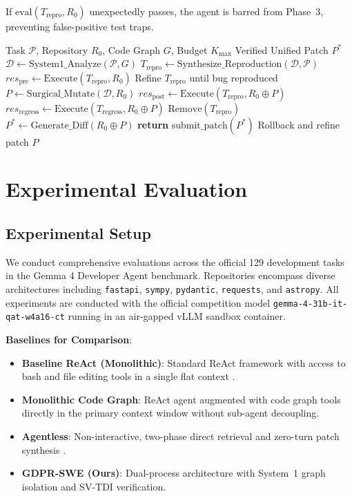 \documentclass[10pt,twocolumn,letterpaper]{article}
\theoremstyle{definition}
\begin{document}
If $\text{eval}(T_{\text{repro}}, R_0)$ unexpectedly passes, the agent is barred from Phase~3, preventing false-positive test traps.

\begin{algorithm}[t]
\caption{GDPR-SWE Execution Cycle}
\label{alg:gdpr}
\begin{algorithmic}[1]
\REQUIRE Task $\mathcal{P}$, Repository $R_0$, Code Graph $G$, Budget $K_{\max}$
\ENSURE Verified Unified Patch $P^*$
\STATE $\mathcal{D} \leftarrow \text{System1\_Analyze}(\mathcal{P}, G)$ 
\STATE $T_{\text{repro}} \leftarrow \text{Synthesize\_Reproduction}(\mathcal{D}, \mathcal{P})$
\STATE $res_{\text{pre}} \leftarrow \text{Execute}(T_{\text{repro}}, R_0)$
    \STATE Refine $T_{\text{repro}}$ until bug reproduced
\ENDIF
\STATE $P \leftarrow \text{Surgical\_Mutate}(\mathcal{D}, R_0)$
\STATE $res_{\text{post}} \leftarrow \text{Execute}(T_{\text{repro}}, R_0 \oplus P)$
\STATE $res_{\text{regress}} \leftarrow \text{Execute}(T_{\text{regress}}, R_0 \oplus P)$
    \STATE $\text{Remove}(T_{\text{repro}})$
    \STATE $P^* \leftarrow \text{Generate\_Diff}(R_0 \oplus P)$
    \STATE \textbf{return} $\text{submit\_patch}(P^*)$
\ELSE
    \STATE Rollback and refine patch $P$
\ENDIF
\end{algorithmic}
\end{algorithm}

\section{Experimental Evaluation}
\label{sec:experiments}

\subsection{Experimental Setup}
We conduct comprehensive evaluations across the official 129 development tasks in the Gemma 4 Developer Agent benchmark. Repositories encompass diverse architectures including \texttt{fastapi}, \texttt{sympy}, \texttt{pydantic}, \texttt{requests}, and \texttt{astropy}. All experiments are conducted with the official competition model \texttt{gemma-4-31b-it-qat-w4a16-ct} running in an air-gapped vLLM sandbox container.

\noindent \textbf{Baselines for Comparison}:
\begin{itemize}
    \item \textbf{Baseline ReAct (Monolithic)}: Standard ReAct framework with access to bash and file editing tools in a single flat context \cite{yao2023react}.
    \item \textbf{Monolithic Code Graph}: ReAct agent augmented with code graph tools directly in the primary context window without sub-agent decoupling.
    \item \textbf{Agentless}: Non-interactive, two-phase direct retrieval and zero-turn patch synthesis \cite{xia2024agentless}.
    \item \textbf{GDPR-SWE (Ours)}: Dual-process architecture with System~1 graph isolation and SV-TDI verification.
\end{itemize}
\end{document}
